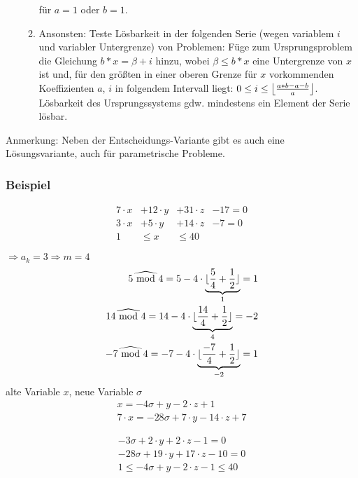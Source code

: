 \begin{enumerate}
\begin{enumerate}
    für $a=1$ oder $b=1$.
  \item Ansonsten: Teste Lösbarkeit in der folgenden Serie (wegen
    variablem $i$ und variabler Untergrenze) von Problemen: Füge zum
    Ursprungsproblem die Gleichung $b*x=\beta + i$ hinzu, wobei
    $\beta\leq b*x$ eine Untergrenze von $x$ ist und, für den
    größten in einer oberen Grenze für $x$ vorkommenden Koeffizienten
    $a$, $i$ in folgendem Intervall liegt: $0\leq i\leq
    \left\lfloor{a*b-a-b\over a}\right\rfloor$.  Lösbarkeit des
    Ursprungssystems gdw. mindestens ein Element der Serie lösbar.
  \end{enumerate}
\end{enumerate}



Anmerkung: Neben der Entscheidungs-Variante gibt es auch eine
Lösungsvariante, auch für parametrische Probleme.

\subsubsection{Beispiel}

\begin{align}
7 \cdot x &+ 12 \cdot y &+ 31 \cdot z  &-17 = 0\\
3 \cdot x &+ 5 \cdot y &+ 14 \cdot z &- 7 = 0\\
1 &\leq x &\leq 40
\end{align}

\( \Rightarrow a_k = 3 \Rightarrow m = 4\) \\
\[
\begin{split}
 5 \widehat{\textrm{\ mod\ }} 4 = 5-4 \cdot \underbrace{\lfloor \frac{5}{4} + \frac{1}{2} \rfloor}_{1} = 1 \\
  14 \widehat{\textrm{\ mod\ }} 4 = 14-4 \cdot \underbrace{\lfloor \frac{14}{4} + \frac{1}{2} \rfloor}_{4} = -2 \\
   -7 \widehat{\textrm{\ mod\ }} 4 = -7-4 \cdot \underbrace{ \lfloor \frac{-7}{4} + \frac{1}{2} \rfloor }_{-2}= 1
\end{split}
\]
alte Variable \(x\), neue Variable \( \sigma \) \\

\[
\begin{split}
 x = -4 \sigma + y - 2 \cdot z + 1 \\
  7\cdot x = -28 \sigma + 7 \cdot y - 14 \cdot z + 7
\end{split}
\]

\begin{align}
 -3 \sigma +2 \cdot y + 2  \cdot z -1 = 0 \\
 -28 \sigma + 19 \cdot y + 17 \cdot z - 10 = 0 \\
 1 \leq - 4 \sigma + y - 2 \cdot z - 1 \leq 40
\end{align}

